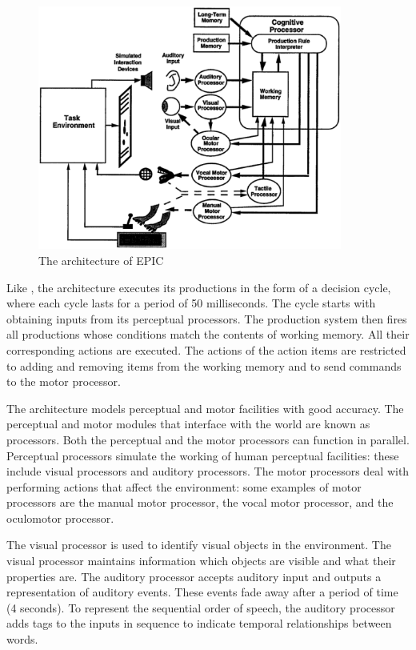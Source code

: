 \begin{figure}[htp]
  \centering
  \includegraphics[width=100mm]{EPIC.eps}
  \caption{The architecture of EPIC\cite{citeulike:3439185}}
  \label{EPIC_ARCH}
\end{figure}
Like \soar, the \epic architecture executes its productions in the
form of a decision cycle, where each cycle lasts for a period of
50 milliseconds. The cycle starts with obtaining inputs from its perceptual
processors. The production system then fires all productions whose
conditions match the contents of working memory.  All their
corresponding actions are executed. The actions of the action items
are restricted to adding and removing items from the working memory
and to send commands to the motor processor.

The \epic architecture models perceptual and motor facilities with
good accuracy. The perceptual and motor modules that interface with
the world are known as processors. Both the perceptual and the motor
processors can function in parallel. Perceptual processors simulate
the working of human perceptual facilities: these include visual
processors and auditory processors. The motor processors deal with
performing actions that affect the environment: some examples of motor
processors are the manual motor processor, the vocal motor processor,
and the oculomotor processor.

The visual processor is used to identify visual objects in the
environment. The visual processor maintains information which objects
are visible and what their properties are. The auditory processor
accepts auditory input and outputs a representation of auditory
events. These events fade away after a period of time (4 seconds). To
represent the sequential order of speech, the auditory processor adds
tags to the inputs in sequence to indicate temporal relationships
between words.

